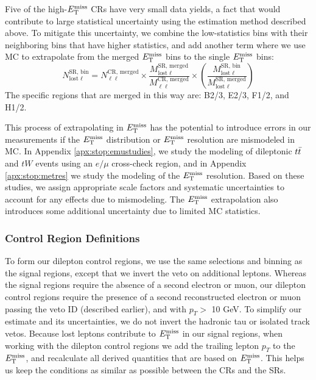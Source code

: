 Five of the high-$E_\text{T}^\text{miss}$ CRs have very small data yields, a fact that
would contribute to large statistical uncertainty using the
estimation method described above. To mitigate this uncertainty, we
combine the low-statistics bins with their neighboring bins that have
higher statistics, and add another term where we use MC to extrapolate
from the merged $E_\text{T}^\text{miss}$ bins to the single $E_\text{T}^\text{miss}$ bins:
\begin{equation}
\label{eq:stop:lostlep:metextrap}
N_{\text{lost }\ell}^\text{SR, bin} = N_{\ell\ell}^\text{CR, merged} \times \frac{M_{\text{lost }\ell}^\text{SR, merged}}{M_{\ell\ell}^\text{CR, merged}}
\times \left( \frac{M_{\text{lost }\ell}^\text{SR, bin}}{M_{\text{lost }\ell}^\text{SR, merged}} \right)
\end{equation}
The specific regions that are merged in this way are: B2/3, E2/3,
F1/2, and H1/2.

This process of extrapolating in $E_\text{T}^\text{miss}$ has the potential to introduce
errors in our measurements if the $E_\text{T}^\text{miss}$ distribution or $E_\text{T}^\text{miss}$ resolution
are mismodeled in MC. In Appendix \ref{apx:stop:emustudies}, we study
the modeling of dileptonic $t\bar{t}$ and $tW$ events using an $e/\mu$ cross-check
region, and in Appendix \ref{apx:stop:metres} we study the modeling of the
$E_\text{T}^\text{miss}$ resolution. Based on these studies, we assign appropriate scale
factors and systematic uncertainties to account for any effects due to
mismodeling. The $E_\text{T}^\text{miss}$ extrapolation also introduces some additional
uncertainty due to limited MC statistics.

\subsubsection{Control Region Definitions}
\label{sssec:stop:lostlep:crdefinitions}

To form our dilepton control regions, we use the same selections and
binning as the signal regions, except that we invert the veto on
additional leptons. Whereas the signal regions require the absence of
a second electron or muon, our dilepton control regions require the
presence of a second reconstructed electron or muon passing the
veto ID (described earlier), and with $p_T >$ 10 GeV. To simplify
our estimate and its uncertainties, we do not invert the
hadronic tau or isolated track vetos. Because lost leptons contribute
to $E_\text{T}^\text{miss}$ in our signal regions, when working with the dilepton
control regions we add the trailing lepton $p_T$ to the $E_\text{T}^\text{miss}$, and
recalculate all derived quantities that are based on $E_\text{T}^\text{miss}$. This
helps us keep the conditions as similar as possible between the CRs
and the SRs.

